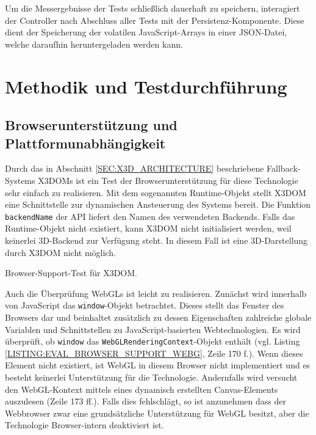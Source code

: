 Um die Messergebnisse der Tests schließlich dauerhaft zu speichern, interagiert der Controller nach Abschluss aller Tests mit der Persistenz-Komponente. Diese dient der Speicherung der volatilen JavaScript-Arrays in einer JSON-Datei, welche daraufhin heruntergeladen werden kann.

\section{Methodik und Testdurchführung}

\subsection{Browserunterstützung und Plattformunabhängigkeit}

Durch das in Abschnitt \ref{SEC:X3D_ARCHITECTURE} beschriebene Fallback-Systems X3DOMs ist ein Test der Browserunterstützung für diese Technologie sehr einfach zu realisieren. Mit dem sogenannten Runtime-Objekt stellt X3DOM eine Schnittstelle zur dynamischen Ansteuerung des Systems bereit. Die Funktion \texttt{backendName} der API liefert den Namen des verwendeten Backends. Falls das Runtime-Objekt nicht existiert, kann X3DOM nicht initialisiert werden, weil keinerlei 3D-Backend zur Verfügung steht. In diesem Fall ist eine 3D-Darstellung durch X3DOM nicht möglich.

\smallskip
\begin{listing}[!htb]
\caption{Browser-Support-Test für X3DOM.}
\label{LISTING:EVAL_BROWSER_SUPPORT_X3DOM}
\end{listing}

Auch die Überprüfung WebGLs ist leicht zu realisieren. Zunächst wird innerhalb von JavaScript das \texttt{window}-Objekt betrachtet. Dieses stellt das Fenster des Browsers dar und beinhaltet zusätzlich zu dessen Eigenschaften zahlreiche globale Variablen und Schnittstellen zu JavaScript-basierten Webtechnologien. Es wird überprüft, ob \texttt{window} das \texttt{WebGLRenderingContext}-Objekt enthält (vgl. Listing \ref{LISTING:EVAL_BROWSER_SUPPORT_WEBG}, Zeile 170 f.). Wenn dieses Element nicht existiert, ist WebGL in diesem Browser nicht implementiert und es besteht keinerlei Unterstützung für die Technologie. Andernfalls wird versucht den WebGL-Kontext mittels eines dynamisch erstellten Canvas-Elements auszulesen (Zeile 173 ff.). Falls dies fehlschlägt, so ist anzunehmen dass der Webbrowser zwar eine grundsätzliche Unterstützung für WebGL besitzt, aber die Technologie Browser-intern deaktiviert ist.

